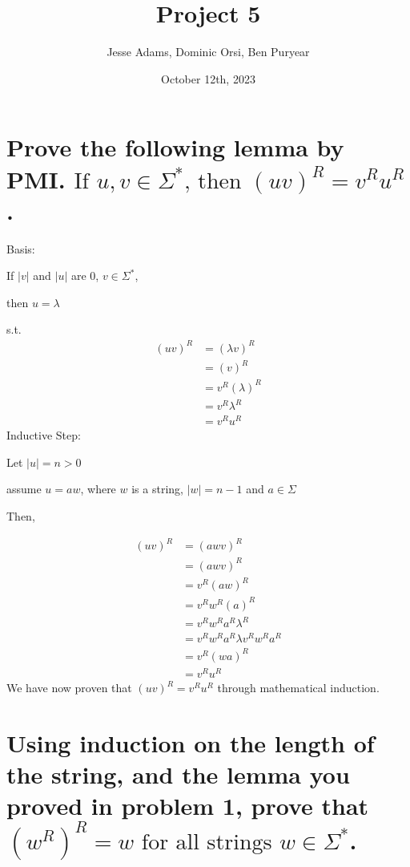 \documentclass{article}
\title{Project 5}
\author{Jesse Adams, Dominic Orsi, Ben Puryear}
\date{October 12th, 2023}
\begin{document}
\maketitle

\section{Prove the following lemma by PMI. $\text{If } u,v \in \Sigma^* \text{, then }(uv)^R =v^Ru^R$.}

Basis:

If $|v|$ and $|u|$ are $0$, $v \in \Sigma^*$,

then $u = \lambda$

s.t.
\begin{align*}
    (uv)^R & = (\lambda v)^R   \\
           & = (v)^R           \\
           & = v^R (\lambda)^R \\
           & = v^R \lambda^R   \\
           & = v^R u^R
\end{align*}
\newline
Inductive Step:

Let $|u| = n > 0$

assume $u = aw$, where $w$ is a string, $|w| = n - 1$ and $a \in \Sigma$

Then,

\begin{align*}
    (uv)^R & = (awv)^R                        \\
           & = (awv)^R                        \\
           & = v^R (aw)^R                     \\
           & =v^R w^R (a)^R                   \\
           & =v^R w^R a^R \lambda^R           \\
           & =v^R w^R a^R \lambda v^R w^R a^R \\
           & =v^R (wa)^R                      \\
           & =v^R u^R
\end{align*}
We have now proven that $(uv)^R = v^R u^R$ through mathematical induction.

\section{Using induction on the length of the string, and the lemma you proved in problem 1, prove that $(w^R)^R = w \text{ for all strings } w \in \Sigma ^*$.}
\end{document}
